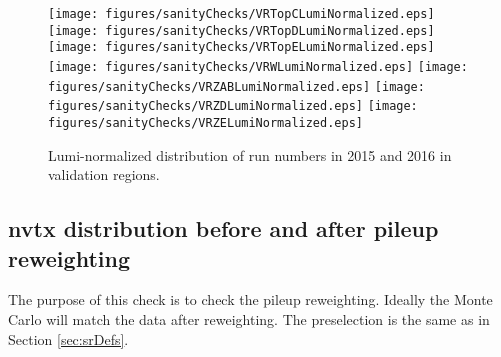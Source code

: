 \begin{figure}[htbp]
\begin{center} 
\texttt{[image: figures/sanityChecks/VRTopCLumiNormalized.eps]}
\texttt{[image: figures/sanityChecks/VRTopDLumiNormalized.eps]}
\texttt{[image: figures/sanityChecks/VRTopELumiNormalized.eps]}
\texttt{[image: figures/sanityChecks/VRWLumiNormalized.eps]}
\texttt{[image: figures/sanityChecks/VRZABLumiNormalized.eps]}
\texttt{[image: figures/sanityChecks/VRZDLumiNormalized.eps]}
\texttt{[image: figures/sanityChecks/VRZELumiNormalized.eps]}
\caption{Lumi-normalized distribution of run numbers in 2015 and 2016 in validation regions.}
\label{fig:Fit2ele}
\end{center}
\end{figure}


\newpage


\subsection{nvtx distribution before and after pileup reweighting}

The purpose of this check is to check the pileup reweighting.  Ideally the Monte Carlo will match the data after reweighting.  The preselection is the same as in Section \ref{sec:srDefs}.%

